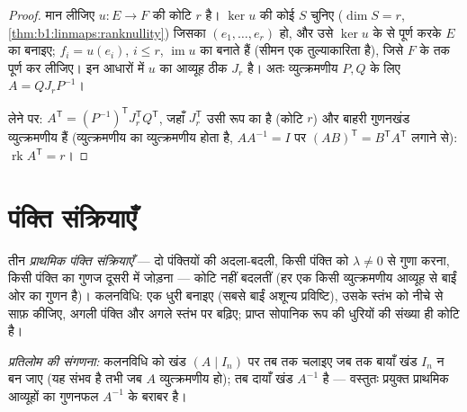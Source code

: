 \begin{proof}
मान लीजिए $u \colon E \to F$ की कोटि $r$ है। $\ker u$ की कोई  $S$ चुनिए
($\dim S = r$, \cref{thm:b1:linmaps:ranknullity}) जिसका  $(e_1, \dots,
e_r)$ हो, और उसे $\ker u$ के  से पूर्ण करके $E$ का  बनाइए; 
$f_i = u(e_i)$, $i \leq r$, $\operatorname{im} u$ का  बनाते हैं (सीमन एक
तुल्याकारिता है), जिसे $F$ के  तक पूर्ण कर लीजिए। इन आधारों में $u$ का
आव्यूह ठीक $J_r$ है। अतः व्युत्क्रमणीय $P, Q$ के लिए $A = Q J_r P^{-1}$।

 लेने पर: $A^{\mathsf T} = (P^{-1})^{\mathsf T} J_r^{\mathsf T}
Q^{\mathsf T}$, जहाँ $J_r^{\mathsf T}$ उसी रूप का है (कोटि $r$) और बाहरी
गुणनखंड व्युत्क्रमणीय हैं (व्युत्क्रमणीय का  व्युत्क्रमणीय होता है,
$AA^{-1} = I$ पर $(AB)^{\mathsf T} = B^{\mathsf T}A^{\mathsf T}$ लगाने से):
$\operatorname{rk} A^{\mathsf T} = r$।
\end{proof}

\section{पंक्ति संक्रियाएँ}

\begin{method}[आव्यूहों पर गाउसीय विलोपन]\label{met:b1:matrices:gauss}
तीन \emph{प्राथमिक पंक्ति संक्रियाएँ} --- दो
पंक्तियों की अदला-बदली, किसी पंक्ति को $\lambda \neq 0$ से गुणा करना, किसी
पंक्ति का गुणज दूसरी में जोड़ना --- कोटि नहीं बदलतीं (हर एक किसी
व्युत्क्रमणीय आव्यूह से बाईं ओर का गुणन है)। कलनविधि: एक धुरी बनाइए (सबसे
बाईं अशून्य प्रविष्टि), उसके स्तंभ को नीचे से साफ़ कीजिए, अगली पंक्ति और
अगले स्तंभ पर बढ़िए; प्राप्त सोपानिक रूप की धुरियों की संख्या ही कोटि है।

\emph{प्रतिलोम की संगणना:} कलनविधि को खंड $(A \mid I_n)$ पर तब तक चलाइए जब
तक बायाँ खंड $I_n$ न बन जाए (यह संभव है तभी जब $A$ व्युत्क्रमणीय हो); तब
दायाँ खंड $A^{-1}$ है --- वस्तुतः प्रयुक्त प्राथमिक आव्यूहों का गुणनफल
$A^{-1}$ के बराबर है।
\end{method}

